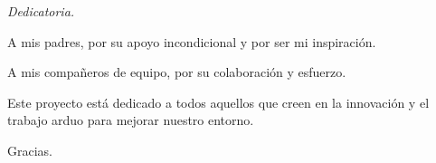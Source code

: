 \begin{dedicatoria}

\hfill
\begin{flushright}
\hspace{8cm} \textit{Dedicatoria.}

A mis padres, por su apoyo incondicional y por ser mi inspiración.

A mis compañeros de equipo, por su colaboración y esfuerzo. 

Este proyecto está dedicado a todos aquellos que creen en la innovación y el trabajo arduo para mejorar nuestro entorno.

Gracias.
\end{flushright}


\end{dedicatoria}

